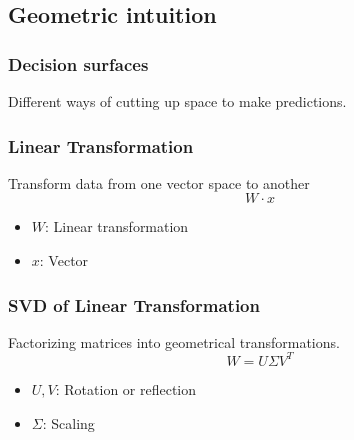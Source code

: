 \subsection{Geometric intuition}
\subsubsection{Decision surfaces}
\begin{notes} 
    Different ways of cutting up space to make predictions.
\end{notes}

\subsubsection{Linear Transformation}
\begin{notes} 
    Transform data from one vector space to another
    \begin{equation}
        W \cdot x 
    \end{equation}
    \begin{itemize}
        \item $W$: Linear transformation
        \item $x$: Vector
    \end{itemize}
\end{notes}

\subsubsection{SVD of Linear Transformation}
\begin{notes}  
    Factorizing matrices into geometrical transformations.
    \begin{equation}
        W = U \Sigma V^T
    \end{equation}
    \begin{itemize}
        \item $U,V$: Rotation or reflection
        \item $\Sigma$: Scaling
    \end{itemize}
\end{notes}

